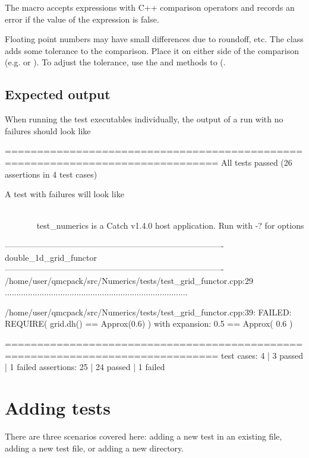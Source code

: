 The  macro accepts expressions with C++ comparison operators and records an error if the value of the expression is false.

Floating point numbers may have small differences due to roundoff, etc.   The  class adds some tolerance to the comparison.  Place it on either side of the comparison (e.g.  or ).   To adjust the tolerance, use the  and  methods to  (.

\subsection{Expected output}

When running the test executables individually, the output of a run with no failures should look like
\begin{shade}
===============================================================================
All tests passed (26 assertions in 4 test cases)
\end{shade}

A test with failures will look like

\begin{minipage}{\linewidth}
\begin{shade}
~~~~~~~~~~~~~~~~~~~~~~~~~~~~~~~~~~~~~~~~~~~~~~~~~~~~~~~~~~~~~~~~~~~~~~~~~~~~~~~
test_numerics is a Catch v1.4.0 host application.
Run with -? for options

-------------------------------------------------------------------------------
double_1d_grid_functor
-------------------------------------------------------------------------------
/home/user/qmcpack/src/Numerics/tests/test_grid_functor.cpp:29
...............................................................................

/home/user/qmcpack/src/Numerics/tests/test_grid_functor.cpp:39: FAILED:
  REQUIRE( grid.dh() == Approx(0.6) )
with expansion:
  0.5 == Approx( 0.6 )

===============================================================================
test cases:  4 |  3 passed | 1 failed
assertions: 25 | 24 passed | 1 failed
\end{shade}
\end{minipage}


\section{Adding tests}
There are three scenarios covered here: adding a new test in an existing file, adding a new test file, or adding a new  directory.

